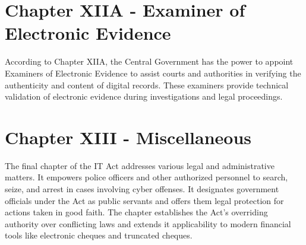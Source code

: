 \documentclass{extreport}
\begin{document}
\section*{Chapter XIIA - Examiner of Electronic Evidence}

\par According to Chapter XIIA, the Central Government has the power to appoint Examiners of Electronic Evidence to assist courts and authorities in verifying the authenticity and content of digital records. These examiners provide technical validation of electronic evidence during investigations and legal proceedings.

\section*{Chapter XIII - Miscellaneous}

\par The final chapter of the IT Act addresses various legal and administrative matters. It empowers police officers and other authorized personnel to search, seize, and arrest in cases involving cyber offenses. It designates government officials under the Act as public servants and offers them legal protection for actions taken in good faith. The chapter establishes the Act's overriding authority over conflicting laws and extends it applicability to modern financial tools like electronic cheques and truncated cheques.
\end{document}
